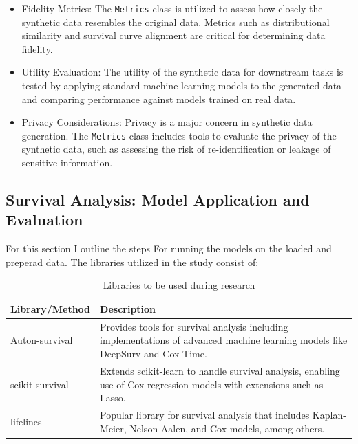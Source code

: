 \begin{itemize}
    \item Fidelity Metrics: The \texttt{Metrics} class is utilized to assess how closely the synthetic data resembles the original data. Metrics such as distributional similarity and survival curve alignment are critical for determining data fidelity. 
    \item Utility Evaluation: The utility of the synthetic data for downstream tasks is tested by applying standard machine learning models to the generated data and comparing performance against models trained on real data. 
    \item Privacy Considerations: Privacy is a major concern in synthetic data generation. The \texttt{Metrics} class includes tools to evaluate the privacy of the synthetic data, such as assessing the risk of re-identification or leakage of sensitive information. 
\end{itemize}

\subsection{Survival Analysis: Model Application and Evaluation}

\noindent For this section I outline the steps For running the models on the loaded and preperad data. The libraries utilized in the study consist of:

\begin{table}[h]
\begin{tabularx}{\textwidth}{|X|X|}
\hline
Library/Method & Description \\
\hline
Auton-survival \parencite{nagpal_auton-survival_2022} & Provides tools for survival analysis including implementations of advanced machine learning models like DeepSurv and Cox-Time. \\
\hline
scikit-survival \parencite{sebastian_polsterl_scikit-survival_2023} & Extends scikit-learn \parencite{scikit-learn} to handle survival analysis, enabling use of Cox regression models with extensions such as Lasso. \\
\hline
lifelines \parencite{davidson-pilon_lifelines_2024} & Popular library for survival analysis that includes Kaplan-Meier, Nelson-Aalen, and Cox models, among others. \\
\hline
\end{tabularx}
\caption{Libraries to be used during research}
\label{tab:libs}
\end{table}

